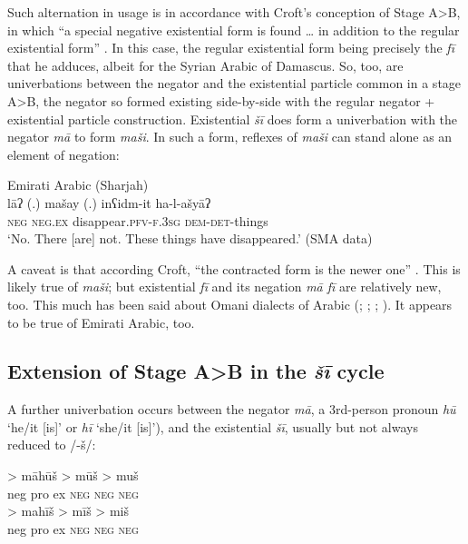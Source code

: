 \documentclass[output=paper]{langsci/langscibook}
\begin{document}
Such alternation in usage is in accordance with Croft’s conception of Stage A>B, in which “a special negative existential form is found … in addition to the regular existential form” \citeyearpar[7]{Croft1991}. In this case, the regular existential form being precisely the \textit{fī} that he adduces, albeit for the Syrian Arabic of Damascus. So, too, are univerbations between the negator and the existential particle common in a stage A>B, the negator so formed existing side-by-side with the regular negator + existential particle construction. Existential \textit{šī} does form a univerbation with the negator \textit{mā} to form \textit{maši}. In such a form, reflexes of \textit{maši} can stand alone as an element of negation:

\ea Emirati Arabic (Sharjah)\label{ex:WiAR-13}\\
	\gll lāʔ (.) mašay (.) inʕidm-it ha-l-ašyāʔ \\
	\textsc{neg} {} \textsc{neg.ex} {} disappear.\textsc{pfv-f.3sg} \textsc{dem-det}-things \\
	\glt ‘No. There [are] not. These things have disappeared.’ (SMA data)
\z

A caveat is that according Croft, “the contracted form is the newer one” \citep[7]{Croft1991}. This is likely true of \textit{maši}; but existential \textit{fī} and its negation \textit{mā fī} are relatively new, too. This much has been said about Omani dialects of Arabic (\citealp[24]{brockett1985a}; \citealp[71]{holes1990a}; \citealp[61]{bernabela2011a}; \citealp[171]{davey2016a}). It appears to be true of Emirati Arabic, too. 

\subsection{Extension of Stage A>B in the \textit{šī} cycle} \label{s:WiAR-3.2}

A further univerbation occurs between the negator \textit{mā}, a 3rd-person pronoun \textit{hū} ‘he/it [is]’ or \textit{hī} ‘she/it [is]’), and the existential \textit{šī}, usually but not always reduced to /-š/:

\ea \label{ex:WiAR-14}
  \ea
  	 > māhūš > mūš > muš\\
  	{\sc neg pro ex} {} \textsc{neg} {} \textsc{neg} {} \textsc{neg}\\
  \ex
  	 > mahīš > mīš > miš\\
  	{\sc neg pro ex} {} \textsc{neg}  {} \textsc{neg} {} \textsc{neg}\\
\z \z
\end{document}
